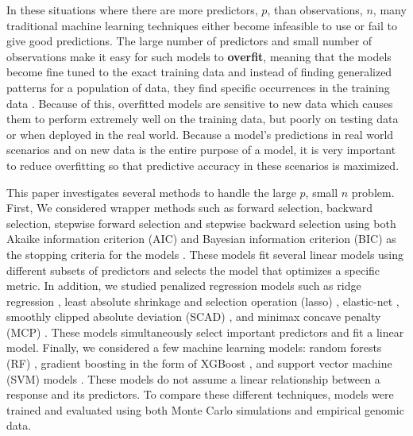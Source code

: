 \documentclass{article}
\begin{document}
In these situations where there are more predictors, $p$, than observations, $n$, many traditional machine learning techniques either become infeasible to use or fail to give good predictions. The large number of predictors and small number of observations make it easy for such models to \textbf{overfit}, meaning that the models become fine tuned to the exact training data and instead of finding generalized patterns for a population of data, they find specific occurrences in the training data \cite{james2013introduction, friedman2001elements}. Because of this, overfitted models are sensitive to new data which causes them to perform extremely well on the training data, but poorly on testing data or when deployed in the real world. Because a model's predictions in real world scenarios and on new data is the entire purpose of a model, it is very important to reduce overfitting so that predictive accuracy in these scenarios is maximized.


This paper investigates several methods to handle the large $p$, small $n$ problem. First, We considered wrapper methods such as forward selection, backward selection, stepwise forward selection and stepwise backward selection using both Akaike information criterion (AIC) and Bayesian information criterion (BIC) as the stopping criteria for the models \cite{akaike1998information, schwarz1978estimating}. These models fit several linear models using different subsets of predictors and selects the model that optimizes a specific metric. In addition, we studied penalized regression models such as ridge regression \cite{hoerl1970ridge}, least absolute shrinkage and selection operation (lasso) \cite{tibshirani1996regression}, elastic-net \cite{zou2005regularization}, smoothly clipped absolute deviation (SCAD) \cite{fan2001variable}, and minimax concave penalty (MCP) \cite{zhang2010nearly}. These models simultaneously select important predictors and fit a linear model. Finally, we considered a few machine learning models: random forests (RF) \cite{breiman2001random}, gradient boosting in the form of XGBoost \cite{chen2021xgboost}, and support vector machine (SVM) models \cite{cortes1995support}. These models do not assume a linear relationship between a response and its predictors. To compare these different techniques, models were trained and evaluated using both Monte Carlo simulations and empirical genomic data.
\end{document}

